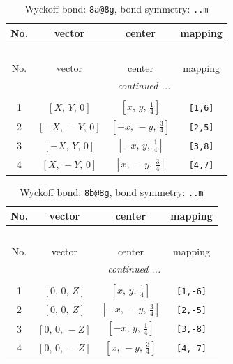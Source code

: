 \documentclass[fleqn,8pt]{jsarticle}
\begin{document}
\begin{longtable}{cccc}
\caption{Wyckoff bond: {\tt 8a@8g}, bond symmetry: {\tt ..m}}
 \\
 \hline \hline
No. & vector & center & mapping \\ \hline \endfirsthead

\multicolumn{3}{l}{\tablename\ \thetable{}} \\
 \hline \hline
No. & vector & center & mapping \\ \hline \endhead

 \hline \hline
\multicolumn{3}{r}{\footnotesize\it continued ...} \\ \endfoot

 \hline \hline
\multicolumn{3}{r}{} \\ \endlastfoot

1 & $\left[ X,\, Y,\, 0 \right]$ & $\left[ x,\, y,\, \frac{1}{4} \right]$ & {\tt [1,6]} \\ \hline
2 & $\left[ - X,\, - Y,\, 0 \right]$ & $\left[ - x,\, - y,\, \frac{3}{4} \right]$ & {\tt [2,5]} \\ \hline
3 & $\left[ - X,\, Y,\, 0 \right]$ & $\left[ - x,\, y,\, \frac{1}{4} \right]$ & {\tt [3,8]} \\ \hline
4 & $\left[ X,\, - Y,\, 0 \right]$ & $\left[ x,\, - y,\, \frac{3}{4} \right]$ & {\tt [4,7]} \\
\end{longtable}
\renewcommand{\arraystretch}{1.2}
\begin{longtable}{cccc}
\caption{Wyckoff bond: {\tt 8b@8g}, bond symmetry: {\tt ..m}}
 \\
 \hline \hline
No. & vector & center & mapping \\ \hline \endfirsthead

\multicolumn{3}{l}{\tablename\ \thetable{}} \\
 \hline \hline
No. & vector & center & mapping \\ \hline \endhead

 \hline \hline
\multicolumn{3}{r}{\footnotesize\it continued ...} \\ \endfoot

 \hline \hline
\multicolumn{3}{r}{} \\ \endlastfoot

1 & $\left[ 0,\, 0,\, Z \right]$ & $\left[ x,\, y,\, \frac{1}{4} \right]$ & {\tt [1,-6]} \\ \hline
2 & $\left[ 0,\, 0,\, Z \right]$ & $\left[ - x,\, - y,\, \frac{3}{4} \right]$ & {\tt [2,-5]} \\ \hline
3 & $\left[ 0,\, 0,\, - Z \right]$ & $\left[ - x,\, y,\, \frac{1}{4} \right]$ & {\tt [3,-8]} \\ \hline
4 & $\left[ 0,\, 0,\, - Z \right]$ & $\left[ x,\, - y,\, \frac{3}{4} \right]$ & {\tt [4,-7]} \\
\end{longtable}
\end{document}
